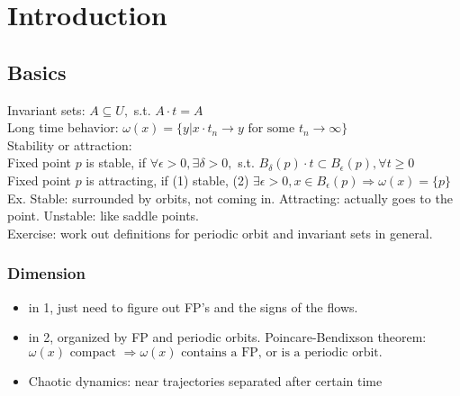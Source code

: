\documentclass[10pt,a4paper]{article}
\begin{document}
\section{Introduction}
\subsection{Basics}
Invariant sets: $A\subseteq U,$ s.t. $A\cdot t=A$\\

Long time behavior: $\omega(x)=\{y|x\cdot t_n\to y\text{ for some }t_n\to\infty\}$\\

Stability or attraction: \\
Fixed point $p$ is stable, if $\forall\epsilon>0,\exists\delta>0,$ s.t. $B_{\delta}(p)\cdot t\subset B_{\epsilon}(p),\forall t\geqslant 0$\\

Fixed point $p$ is attracting, if (1) stable, (2) $\exists\epsilon >0,x\in B_{\epsilon}(p)\Longrightarrow\omega(x)=\{p\}$\\

Ex. Stable: surrounded by orbits, not coming in. Attracting: actually goes to the point. Unstable: like saddle points.\\

Exercise: work out definitions for periodic orbit and invariant sets in general.\\

\subsubsection{Dimension} 
\begin{itemize}
	\item in 1, just need to figure out FP's and the signs of the flows.\\
	\item in 2, organized by FP and periodic orbits. Poincare-Bendixson theorem: $\omega(x)\text{ compact }\Longrightarrow\omega(x)\text{ contains a FP, or is a periodic orbit.}$
	\item Chaotic dynamics: near trajectories separated after certain time
\end{itemize}
\end{document}
